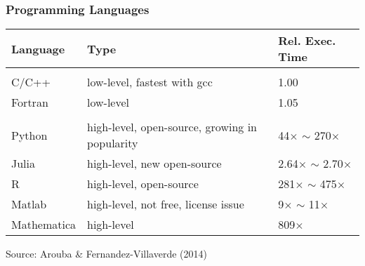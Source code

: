 \documentclass[xcolor=x11names,compress]{beamer}
\renewcommand{\(}{\begin{columns}}
\renewcommand{\)}{\end{columns}}
\newcommand{\<}[1]{\begin{column}{#1}}
\renewcommand{\>}{\end{column}}
\begin{document}
\begin{frame}
\frametitle{Programming Languages }
\begin{center}
\small
\begin{tabular}{p{2cm} | p{5cm} | p{3cm}}
\hline
Language & Type & Rel. Exec. Time\\[0.1em]
\hline \hline
&&\\[-0.8em]
C/C++ 	& low-level, fastest with gcc & 1.00 \\[0.2em]
Fortran & low-level  & 1.05 \\[0.2em] 
\hline
&&\\[-0.8em]
Python 	& high-level, open-source, growing in popularity & 44$\times$ $\sim$ 270$\times$ \\[0.2em]
Julia 	& high-level, new open-source & 2.64$\times$ $\sim$ 2.70$\times$ \\[0.2em]
R & high-level, open-source & 281$\times$ $\sim$ 475$\times$ \\[0.2em]
Matlab & high-level, not free, license issue & 9$\times$ $\sim$ 11$\times$ \\[0.2em]
Mathematica & high-level & 809$\times$ \\[0.2em]
\hline
\end{tabular}
\end{center}
\vspace{-0.8em}
\hspace{1em}\scriptsize{Source: Arouba \& Fernandez-Villaverde (2014)}
\end{frame}
\end{document}
